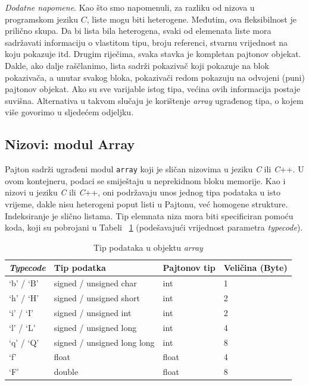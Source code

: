 \textit{Dodatne napomene}. Kao što smo napomenuli, za razliku od nizova u programskom jeziku $C$, liste mogu biti heterogene. Međutim, ova fleksibilnost je prilično skupa. Da bi lista bila heterogena, svaki od elemenata liste mora sadržavati informaciju o vlastitom tipu, broju referenci, stvarnu vrijednost na koju pokazuje itd. Drugim riječima, svaka stavka je kompletan pajtonov objekat. Dakle, ako   dalje raščlani\-mo, lista sadrži pokazivač koji   pokazuje na   blok pokazivača, a unutar svakog bloka,  pokazivači redom pokazuju na odvojeni (puni) pajtonov objekat.  Ako su sve varijable istog tipa, većina ovih informacija postaje suvišna. Alternativa u takvom slučaju je korištenje \textit{array} ugrađenog tipa, o kojem više govorimo u sljedećem odjeljku.   %

\subsection{Nizovi: modul Array}

Pajton sadrži ugrađeni modul \texttt{array} koji je sličan nizovima u jeziku  \textit{C} ili \textit{C}++. U ovom kontejneru, podaci se smiještaju u neprekidnom bloku memorije. Kao i nizovi u jeziku \textit{C} ili \textit{C}++, oni podržavaju unos jednog tipa podataka u isto vrijeme, dakle nisu heterogeni poput listi u Pajtonu, već homogene strukture. Indeksiranje je slično listama. Tip elemnata niza mora biti specificiran pomoću koda, koji su pobrojani u Tabeli~ \ref{tab: Tip podataka u objektu array} (podešavajući vrijednost parametra \textit{typecode}). 

\begin{table}[!ht]
	\caption{ Tip podataka u objektu \textit{array}}\label{tab: Tip podataka u objektu array}
	\centering
	\begin{tabular}{llll}  \hline \hline
		\emph{Typecode}      & Tip podatka                  & Pajtonov tip & Veličina (Byte) \\ \hline \hline
		`b' / `B' & signed / unsigned char    & int   & 1 \\
		
		`h' / `H'  & signed / unsigned  short  & int   & 2 \\
        `i' / `I'  & signed / unsigned int     & int   & 2 \\
        `l' / `L'  &  signed / unsigned long   & int   & 4 \\
        `q' / `Q'  & signed / unsigned long long & int & 8 \\
        `f'        & float                       & float & 4 \\
         `F'       & double                      & float & 8 \\ \hline \hline
		
	\end{tabular} 

\end{table}

